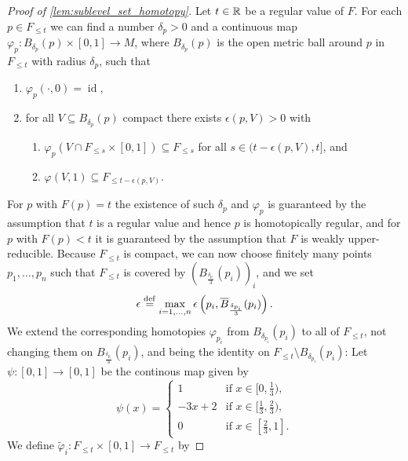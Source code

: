 \begin{proof}[Proof of \cref{lem:sublevel_set_homotopy}]
	Let $t \in \mathbb{R}$ be a regular value of $F$.
	For each $p \in F_{\leq t}$ we can find a number $\delta_{p} > 0$ and a continuous map $\varphi_{p} \colon B_{\delta_{p}}(p) \times [0,1] \to M$, where $B_{\delta_{p}}(p)$ is the open metric ball around $p$ in $F_{\leq t}$ with radius $\delta_{p}$, such that 
	\begin{enumerate}
		\item $\varphi_{p}(\cdot,0) = \operatorname{id}$,
		\item for all $V \subseteq B_{\delta_{p}}(p)$ compact there exists $\epsilon(p,V) > 0$ with 
		\begin{enumerate}
			\item $\varphi_{p}(V \cap F_{\leq s}\times [0,1]) \subseteq F_{\leq s}$ for all $s \in (t - \epsilon(p,V), t]$, and
			\item $\varphi(V,1) \subseteq F_{\leq t - \epsilon(p,V)}$.
		\end{enumerate}
	\end{enumerate}
	For $p$ with $F(p) = t$ the existence of such $\delta_{p}$ and $\varphi_{p}$ is guaranteed by the assumption that $t$ is a regular value and hence $p$ is homotopically regular,
	and for $p$ with $F(p) < t$ it is guaranteed by the assumption that $F$ is weakly upper-reducible.
	Because $F_{\leq t}$ is compact, we can now choose finitely many points $p_{1}, \dots, p_{n}$ such that $F_{\leq t}$ is covered by $( B_{\frac{\delta_{p_{i}}}{3}}(p_{i}))_{i}$, and we set 
	\[
		\epsilon \stackrel{\mathrm{def}}{=} \max_{i = 1,\dots,n} \epsilon \left( p_{i}, \overline{B}_{\frac{\delta_{p_{i}}}{3}}(p_{i}) \right).
	\]
	We extend the corresponding homotopies $\varphi_{p_{i}}$ from $B_{\delta_{p_{i}}}(p_{i})$ to all of $F_{\leq t}$, not changing them on $B_{\frac{\delta_{p_{i}}}{3}}(p_{i})$, and being the identity on $F_{\leq t} \setminus B_{\delta_{p_{i}}}(p_{i})$:
	Let $\psi \colon [0,1] \to [0,1]$ be the continous map given by 
	\[
		\psi(x) = 
		\begin{cases}
			1  & \text{if } x \in [0,\frac{1}{3}), \\
			-3x + 2 & \text{if } x \in [\frac{1}{3}, \frac{2}{3}), \\
			0 & \text{if } x \in [\frac{2}{3},1].
		\end{cases}
	\]
	We define $\tilde{\varphi}_{i} \colon F_{\leq t} \times [0,1] \to F_{\leq t}$ by 

\end{proof}
